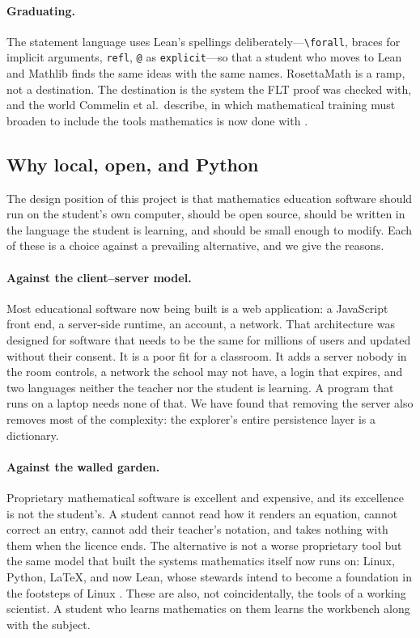 \documentclass[11pt]{article}
\begin{document}
\paragraph{Graduating.} The statement language uses Lean's spellings
deliberately---\verb|\forall|, braces for implicit arguments, \verb|refl|,
\verb|@| as \verb|explicit|---so that a student who moves to Lean and Mathlib
finds the same ideas with the same names. RosettaMath is a ramp, not a
destination. The destination is the system the FLT proof was checked with, and
the world Commelin et al.\ describe, in which mathematical training must
broaden to include the tools mathematics is now done with \cite{commelin2026}.

\subsection{Why local, open, and Python}

The design position of this project is that mathematics education software
should run on the student's own computer, should be open source, should be
written in the language the student is learning, and should be small enough to
modify. Each of these is a choice against a prevailing alternative, and we give
the reasons.

\paragraph{Against the client--server model.} Most educational software now
being built is a web application: a JavaScript front end, a server-side runtime,
an account, a network. That architecture was designed for software that needs
to be the same for millions of users and updated without their consent. It is a
poor fit for a classroom. It adds a server nobody in the room controls, a
network the school may not have, a login that expires, and two languages
neither the teacher nor the student is learning. A program that runs on a laptop
needs none of that. We have found that removing the server also removes most of
the complexity: the explorer's entire persistence layer is a dictionary.

\paragraph{Against the walled garden.} Proprietary mathematical software is
excellent and expensive, and its excellence is not the student's. A student
cannot read how it renders an equation, cannot correct an entry, cannot add
their teacher's notation, and takes nothing with them when the licence ends.
The alternative is not a worse proprietary tool but the same model that built
the systems mathematics itself now runs on: Linux, Python, \LaTeX{}, and now
Lean, whose stewards intend to become a foundation in the footsteps of Linux 
\cite{simons2026}. These are also, not coincidentally, the tools of a
working scientist. A student who learns mathematics on them learns the
workbench along with the subject.
\end{document}
